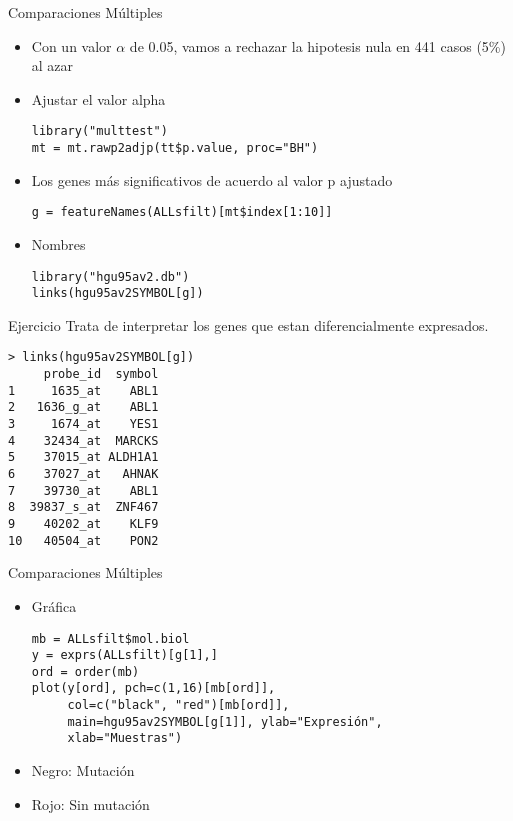 \documentclass{beamer}
\begin{document}
\begin{frame}[fragile]{Comparaciones Múltiples}
\begin{itemize}
\item Con un valor $\alpha$ de 0.05, vamos a rechazar la hipotesis nula en 441 casos (5\%) al azar
\item Ajustar el valor alpha
\begin{verbatim}
library("multtest")
mt = mt.rawp2adjp(tt$p.value, proc="BH")
\end{verbatim}
\item Los genes más significativos de acuerdo al valor p ajustado
\begin{verbatim}
g = featureNames(ALLsfilt)[mt$index[1:10]]
\end{verbatim}
\item Nombres
\begin{verbatim}
library("hgu95av2.db")
links(hgu95av2SYMBOL[g])
\end{verbatim}
\end{itemize}
\end{frame}



\begin{frame}[fragile]
\begin{block}{Ejercicio}
Trata de interpretar los genes que estan diferencialmente expresados.
\begin{verbatim}
> links(hgu95av2SYMBOL[g])
     probe_id  symbol
1     1635_at    ABL1
2   1636_g_at    ABL1
3     1674_at    YES1
4    32434_at  MARCKS
5    37015_at ALDH1A1
6    37027_at   AHNAK
7    39730_at    ABL1
8  39837_s_at  ZNF467
9    40202_at    KLF9
10   40504_at    PON2
\end{verbatim}
\end{block}

\end{frame}

\begin{frame}[fragile]{Comparaciones Múltiples}
\begin{itemize}
\item Gráfica
\begin{verbatim}
mb = ALLsfilt$mol.biol
y = exprs(ALLsfilt)[g[1],]
ord = order(mb)
plot(y[ord], pch=c(1,16)[mb[ord]],
     col=c("black", "red")[mb[ord]],
     main=hgu95av2SYMBOL[g[1]], ylab="Expresión",
     xlab="Muestras")
\end{verbatim}
\item Negro: Mutación
\item Rojo: Sin mutación 
\end{itemize}
\end{frame}
\end{document}

